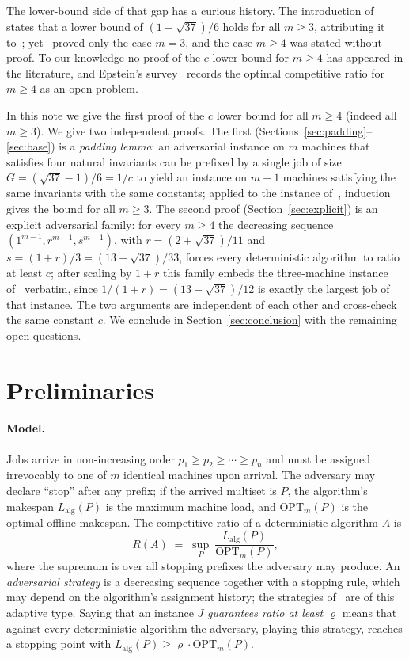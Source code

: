 \documentclass[11pt]{article}
\theoremstyle{definition}
\newcommand{\opt}{\mathrm{OPT}}
\newcommand{\alg}{\mathrm{alg}}
\begin{document}
The lower-bound side of that gap has a curious history. The introduction
of~\cite{CKK12} states that a lower bound of $(1+\sqrt{37})/6$ holds for all
$m\ge 3$, attributing it to~\cite{SSW00}; yet~\cite{SSW00} proved only the
case $m=3$, and the case $m\ge 4$ was stated without proof. To our
knowledge no proof of the $c$ lower bound for $m\ge 4$ has appeared in the
literature, and Epstein's survey~\cite{Eps18} records the optimal
competitive ratio for $m\ge 4$ as an open problem.

In this note we give the first proof of the $c$ lower bound for all $m\ge 4$
(indeed all $m\ge 3$). We give two independent proofs. The first
(Sections~\ref{sec:padding}--\ref{sec:base}) is a \emph{padding lemma}: an
adversarial instance on $m$ machines that satisfies four natural invariants
can be prefixed by a single job of size $G=(\sqrt{37}-1)/6=1/c$ to yield an
instance on $m+1$ machines satisfying the same invariants with the same
constants; applied to the instance of~\cite{SSW00}, induction gives the
bound for all $m\ge 3$. The second proof (Section~\ref{sec:explicit}) is an
explicit adversarial family: for every $m\ge 4$ the decreasing sequence
$(1^{m-1},r^{m-1},s^{m-1})$, with $r=(2+\sqrt{37})/11$ and
$s=(1+r)/3=(13+\sqrt{37})/33$, forces every deterministic algorithm to ratio
at least $c$; after scaling by $1+r$ this family embeds the three-machine
instance of~\cite{SSW00} verbatim, since $1/(1+r)=(13-\sqrt{37})/12$ is
exactly the largest job of that instance. The two arguments are independent
of each other and cross-check the same constant $c$. We conclude in
Section~\ref{sec:conclusion} with the remaining open questions.

\section{Preliminaries}
\label{sec:prelim}

\paragraph{Model.}
Jobs arrive in non-increasing order $p_{1}\ge p_{2}\ge\cdots\ge p_{n}$ and
must be assigned irrevocably to one of $m$ identical machines upon arrival.
The adversary may declare ``stop'' after any prefix; if the arrived multiset
is $P$, the algorithm's makespan $L_{\alg}(P)$ is the maximum machine load,
and $\opt_{m}(P)$ is the optimal offline makespan. The competitive ratio of
a deterministic algorithm $A$ is
\[
R(A) \;=\; \sup_{P}\ \frac{L_{\alg}(P)}{\opt_{m}(P)},
\]
where the supremum is over all stopping prefixes the adversary may produce.
An \emph{adversarial strategy} is a decreasing sequence together with a
stopping rule, which may depend on the algorithm's assignment history; the
strategies of~\cite{SSW00} are of this adaptive type. Saying that an
instance $J$ \emph{guarantees ratio at least $\varrho$} means that against
every deterministic algorithm the adversary, playing this strategy, reaches
a stopping point with $L_{\alg}(P)\ge\varrho\cdot\opt_{m}(P)$.
\end{document}
